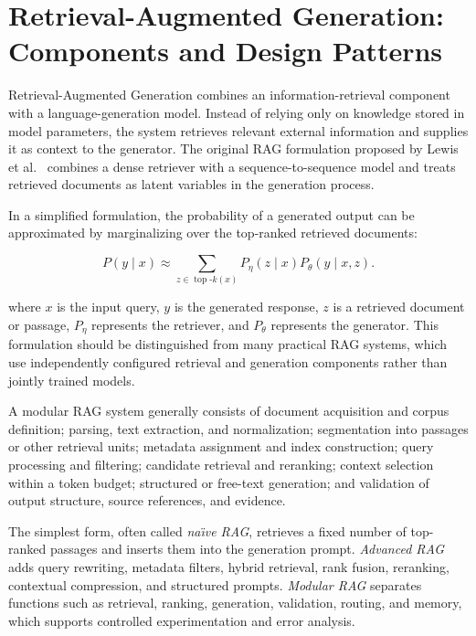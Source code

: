 \documentclass[12pt,a4paper]{report}
\numberwithin{equation}{chapter}
\begin{document}
\section{Retrieval-Augmented Generation: Components and Design Patterns}

Retrieval-Augmented Generation combines an information-retrieval component with a language-generation model. Instead of relying only on knowledge stored in model parameters, the system retrieves relevant external information and supplies it as context to the generator. The original RAG formulation proposed by Lewis et al.~\cite{Lewis2020} combines a dense retriever with a sequence-to-sequence model and treats retrieved documents as latent variables in the generation process.

In a simplified formulation, the probability of a generated output can be approximated by marginalizing over the top-ranked retrieved documents:

\begin{equation}
\label{eq:rag-probability}
P(y \mid x) \approx
\sum_{z \in \operatorname{top}\text{-}k(x)}
P_{\eta}(z \mid x) P_{\theta}(y \mid x,z).
\end{equation}

where \(x\) is the input query, \(y\) is the generated response, \(z\) is a retrieved document or passage, \(P_{\eta}\) represents the retriever, and \(P_{\theta}\) represents the generator. This formulation should be distinguished from many practical RAG systems, which use independently configured retrieval and generation components rather than jointly trained models.

A modular RAG system generally consists of document acquisition and corpus definition; parsing, text extraction, and normalization; segmentation into passages or other retrieval units; metadata assignment and index construction; query processing and filtering; candidate retrieval and reranking; context selection within a token budget; structured or free-text generation; and validation of output structure, source references, and evidence.

The simplest form, often called \textit{na\"{\i}ve RAG}, retrieves a fixed number of top-ranked passages and inserts them into the generation prompt. \textit{Advanced RAG} adds query rewriting, metadata filters, hybrid retrieval, rank fusion, reranking, contextual compression, and structured prompts. \textit{Modular RAG} separates functions such as retrieval, ranking, generation, validation, routing, and memory, which supports controlled experimentation and error analysis.
\end{document}
